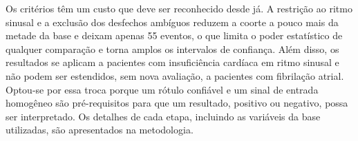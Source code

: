 \begin{table}[h!]
    \captionsetup{width=13cm}
\end{table}

Os critérios têm um custo que deve ser reconhecido desde já. A restrição ao
ritmo sinusal e a exclusão dos desfechos ambíguos reduzem a coorte a pouco
mais da metade da base e deixam apenas 55 eventos, o que limita o poder
estatístico de qualquer comparação e torna amplos os intervalos de
confiança. Além disso, os resultados se aplicam a pacientes com
insuficiência cardíaca em ritmo sinusal e não podem ser estendidos, sem nova
avaliação, a pacientes com fibrilação atrial. Optou-se por essa troca porque
um rótulo confiável e um sinal de entrada homogêneo são pré-requisitos para
que um resultado, positivo ou negativo, possa ser interpretado. Os detalhes
de cada etapa, incluindo as variáveis da base utilizadas, são apresentados
na metodologia.